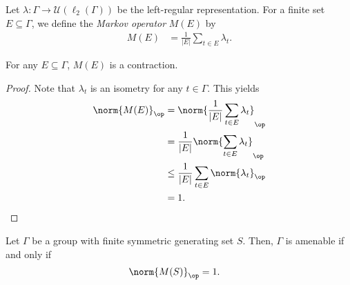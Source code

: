 \begin{definition}
  Let $\lambda\colon \Gamma\rightarrow \mathcal{U}\left( \ell_2\left( \Gamma \right) \right)$ be the left-regular representation. For a finite set $E\subseteq \Gamma$, we define the \textit{Markov operator} $M(E)$ by
  \begin{align*}
    M(E) &= \frac{1}{\left\vert E \right\vert} \sum_{t\in E}\lambda_t.
  \end{align*}
\end{definition}
\begin{fact}
  For any $E\subseteq \Gamma$, $M(E)$ is a contraction.
\end{fact}
\begin{proof}
  Note that $\lambda_t$ is an isometry for any $t\in \Gamma$. This yields
  \begin{align*}
    \norm{M(E)}_{\op} &= \norm{\frac{1}{\left\vert E \right\vert} \sum_{t\in E}\lambda_t}_{\op}\\
                      &= \frac{1}{\left\vert E \right\vert}\norm{\sum_{t\in E}\lambda_t}_{\op}\\
                      &\leq \frac{1}{\left\vert E \right\vert}\sum_{t\in E}\norm{\lambda_t}_{\op}\\
                      &= 1.
  \end{align*}
\end{proof}
\begin{theorem}\label{thm:kesten_criterion}
  Let $\Gamma$ be a group with finite symmetric generating set $S$. Then, $\Gamma$ is amenable if and only if
  \begin{align*}
    \norm{M(S)}_{\op} &= 1.
  \end{align*}
\end{theorem}
